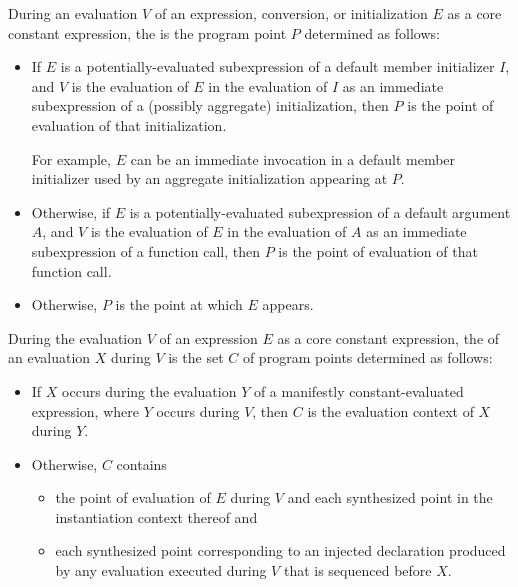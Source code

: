 \pnum
During an evaluation $V$ of
an expression, conversion, or initialization $E$
as a core constant expression, the
%
%
%
is the program point $P$ determined as follows:
\begin{itemize}
\item
If $E$ is a potentially-evaluated subexpression of
a default member initializer $I$, and
$V$ is the evaluation of $E$ in the evaluation of $I$
as an immediate subexpression of a (possibly aggregate) initialization, then
$P$ is the point of evaluation of that initialization.
\begin{tailnote}
For example,
$E$ can be an immediate invocation in a default member initializer
used by an aggregate initialization appearing at $P$.
\end{tailnote}

\item
Otherwise,
if $E$ is a potentially-evaluated subexpression of
a default argument $A$, and
$V$ is the evaluation of $E$ in the evaluation of $A$ as
an immediate subexpression of a function call, then
$P$ is the point of evaluation of that function call.

\item
Otherwise,
$P$ is the point at which $E$ appears.
\end{itemize}
During the evaluation $V$ of an expression $E$ as a core constant expression,
the  of an evaluation $X$
during $V$ is the set $C$ of program points determined as follows:
\begin{itemize}
\item
If $X$ occurs during the evaluation $Y$ of
a manifestly constant-evaluated expression,
where $Y$ occurs during $V$, then
$C$ is the evaluation context of $X$ during $Y$.
\item
Otherwise, $C$ contains
  \begin{itemize}
  \item
  the point of evaluation of $E$ during $V$ and
  each synthesized point in the instantiation context thereof and
  \item
  each synthesized point corresponding to an injected declaration
  produced by any evaluation executed during $V$ that
  is sequenced before $X$.
  \end{itemize}
\end{itemize}

